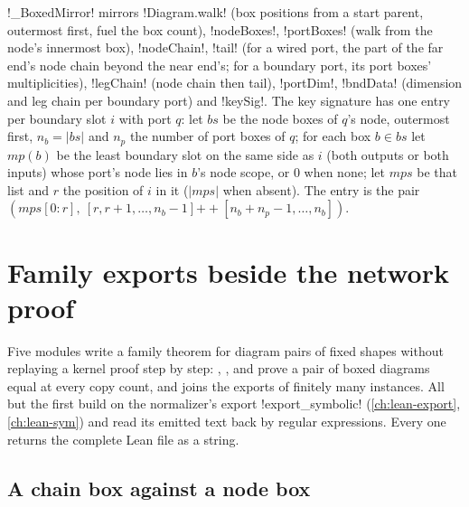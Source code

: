 {\py!_BoxedMirror! mirrors \lean!Diagram.walk! (box positions from a start parent, outermost first,
fuel the box count), \lean!nodeBoxes!, \lean!portBoxes! (walk from the node's innermost box),
\lean!nodeChain!, \lean!tail! (for a wired port, the part of the far end's node chain beyond the
near end's; for a boundary port, its port boxes' multiplicities), \lean!legChain!
(node chain then tail), \lean!portDim!, \lean!bndData! (dimension and leg chain per boundary port)
and \lean!keySig!. The key signature has one entry per boundary slot $i$ with port $q$: let $bs$ be the node boxes of $q$'s node, outermost first, $n_b = |bs|$ and $n_p$ the number of port boxes of $q$; for each box $b\in bs$ let $\mathit{mp}(b)$ be the least boundary slot on the same side as $i$ (both outputs or both inputs) whose port's node lies in $b$'s node scope, or 0 when none; let $\mathit{mps}$ be that list and $r$ the position of $i$ in it ($|\mathit{mps}|$ when absent). The entry is the pair $(\mathit{mps}[0{:}r],\ [r, r+1, \dots, n_b-1] \mathbin{+\!\!+} [n_b+n_p-1, \dots, n_b])$.

\section{Family exports beside the network proof}\label{sec:lean-export-net-beside}

Five modules write a family theorem for diagram pairs of fixed shapes without replaying a kernel
proof step by step: ,
,  and
 prove a pair of boxed diagrams equal at every copy
count, and  joins the exports of finitely many instances.
All but the first build on the normalizer's export \py!export_symbolic! (\cref{ch:lean-export},
\cref{ch:lean-sym}) and read its emitted text back by regular expressions. Every one returns the
complete Lean file as a string.

\subsection{A chain box against a node box}\label{sec:lean-export-net-chainnode}

}
